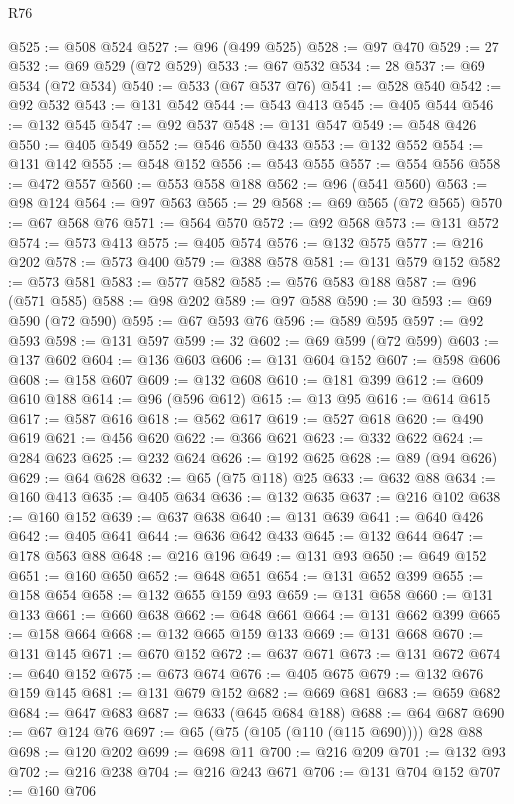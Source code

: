 \begin{lexlean}{R76}
\begin{coremodule}
@525 := @508 @524
@527 := @96 (@499 @525)
@528 := @97 @470
@529 := 27
@532 := @69 @529 (@72 @529)
@533 := @67 @532
@534 := 28
@537 := @69 @534 (@72 @534)
@540 := @533 (@67 @537 @76)
@541 := @528 @540
@542 := @92 @532
@543 := @131 @542
@544 := @543 @413
@545 := @405 @544
@546 := @132 @545
@547 := @92 @537
@548 := @131 @547
@549 := @548 @426
@550 := @405 @549
@552 := @546 @550 @433
@553 := @132 @552
@554 := @131 @142
@555 := @548 @152
@556 := @543 @555
@557 := @554 @556
@558 := @472 @557
@560 := @553 @558 @188
@562 := @96 (@541 @560)
@563 := @98 @124
@564 := @97 @563
@565 := 29
@568 := @69 @565 (@72 @565)
@570 := @67 @568 @76
@571 := @564 @570
@572 := @92 @568
@573 := @131 @572
@574 := @573 @413
@575 := @405 @574
@576 := @132 @575
@577 := @216 @202
@578 := @573 @400
@579 := @388 @578
@581 := @131 @579 @152
@582 := @573 @581
@583 := @577 @582
@585 := @576 @583 @188
@587 := @96 (@571 @585)
@588 := @98 @202
@589 := @97 @588
@590 := 30
@593 := @69 @590 (@72 @590)
@595 := @67 @593 @76
@596 := @589 @595
@597 := @92 @593
@598 := @131 @597
@599 := 32
@602 := @69 @599 (@72 @599)
@603 := @137 @602
@604 := @136 @603
@606 := @131 @604 @152
@607 := @598 @606
@608 := @158 @607
@609 := @132 @608
@610 := @181 @399
@612 := @609 @610 @188
@614 := @96 (@596 @612)
@615 := @13 @95
@616 := @614 @615
@617 := @587 @616
@618 := @562 @617
@619 := @527 @618
@620 := @490 @619
@621 := @456 @620
@622 := @366 @621
@623 := @332 @622
@624 := @284 @623
@625 := @232 @624
@626 := @192 @625
@628 := @89 (@94 @626)
@629 := @64 @628
@632 := @65 (@75 @118) @25
@633 := @632 @88
@634 := @160 @413
@635 := @405 @634
@636 := @132 @635
@637 := @216 @102
@638 := @160 @152
@639 := @637 @638
@640 := @131 @639
@641 := @640 @426
@642 := @405 @641
@644 := @636 @642 @433
@645 := @132 @644
@647 := @178 @563 @88
@648 := @216 @196
@649 := @131 @93
@650 := @649 @152
@651 := @160 @650
@652 := @648 @651
@654 := @131 @652 @399
@655 := @158 @654
@658 := @132 @655 @159 @93
@659 := @131 @658
@660 := @131 @133
@661 := @660 @638
@662 := @648 @661
@664 := @131 @662 @399
@665 := @158 @664
@668 := @132 @665 @159 @133
@669 := @131 @668
@670 := @131 @145
@671 := @670 @152
@672 := @637 @671
@673 := @131 @672
@674 := @640 @152
@675 := @673 @674
@676 := @405 @675
@679 := @132 @676 @159 @145
@681 := @131 @679 @152
@682 := @669 @681
@683 := @659 @682
@684 := @647 @683
@687 := @633 (@645 @684 @188)
@688 := @64 @687
@690 := @67 @124 @76
@697 := @65 (@75 (@105 (@110 (@115 @690)))) @28 @88
@698 := @120 @202
@699 := @698 @11
@700 := @216 @209
@701 := @132 @93
@702 := @216 @238
@704 := @216 @243 @671
@706 := @131 @704 @152
@707 := @160 @706

\end{coremodule}
\end{lexlean}
